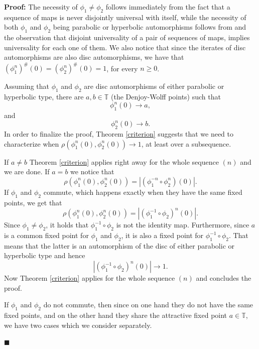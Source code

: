 \documentclass[12pt,a4paper]{amsart}
\theoremstyle{plain}
\theoremstyle{definition}
\theoremstyle{remark}
\theoremstyle{fact}
\newenvironment{pf}
{\noindent\textbf{Proof:}}
{\hfill $\blacksquare$\par\medskip}
\begin{document}
    \begin{pf}
        The necessity of $\phi_1\neq \phi_2$ follows immediately from the fact that a sequence of maps is never disjointly universal with itself, while the necessity of both $\phi_1$ and $\phi_2$ being parabolic or hyperbolic automorphisms follows from \cite[Corollary 4.1]{BGGM09} and the observation that disjoint universality of a pair of sequences of maps, implies universality for each one of them. We also notice that since the iterates of disc automorphisms are also disc automorphisms, we have that $(\phi_1^n)^\#(0)=(\phi_2^n)^\#(0)=1$, for every $n\geq 0$. 

        Assuming that $\phi_1$ and $\phi_2$ are disc automorphisms of either parabolic or hyperbolic type, there are $a,b\in \mathbb{T}$ (the Denjoy-Wolff points) such that
        $$
        \phi_1^n(0)\rightarrow a,
        $$
        and
        $$
        \phi_2^n(0)\rightarrow b.
        $$
        In order to finalize the proof, Theorem \ref{criterion} suggests that we need to characterize when $\rho(\phi_1^n(0),\phi_2^n(0))\rightarrow 1$, at least over a subsequence.
        
        If $a\neq b$ Theorem \ref{criterion} applies right away for the whole sequence $(n)$ and we are done. If $a=b$ we notice that
        $$
        \rho(\phi_1^n(0),\phi_2^n(0))=|(\phi_1^{-n}\circ \phi_2^n)(0)|.
        $$
        If $\phi_1$ and $\phi_2$ commute, which happens exactly when they have the same fixed points, we get that
        $$
        \rho(\phi_1^n(0),\phi_2^n(0))=|(\phi_1^{-1}\circ \phi_2)^n(0)|.
        $$
        Since $\phi_1\neq \phi _2$, it holds that $\phi_1^{-1}\circ \phi_2$ is not the identity map. Furthermore, since $a$ is a common fixed point for $\phi_1$ and $\phi_2$, it is also a fixed point for $\phi_1^{-1}\circ \phi_2$. That means that the latter is an automorphism of the disc of either parabolic or hyperbolic type and hence
        $$
        |(\phi_1^{-1}\circ \phi_2)^n(0)|\rightarrow 1.
        $$
        Now Theorem \ref{criterion} applies for the whole sequence $(n)$ and concludes the proof. 

        If $\phi_1$ and $\phi_2$ do not commute, then since on one hand they do not have the same fixed points, and on the other hand they share the attractive fixed point $a\in \mathbb{T}$, we have two cases which we consider separately.


\end{pf}
\end{document}
